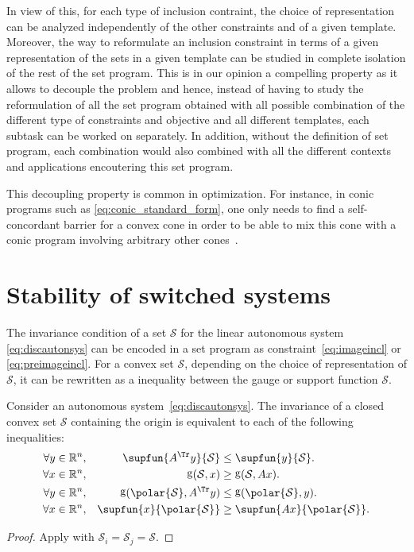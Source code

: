 \documentclass[11pt,twoside,a4paper,openright]{uclouvain-thesis}
\DeclareMathOperator{\gauge}{g}
\begin{document}
In view of this, for each type of inclusion contraint, the choice of representation
can be analyzed independently of the other constraints and of a given template.
Moreover, the way to reformulate an inclusion constraint in terms of a given representation of the sets in a given template can be studied in complete isolation of the rest of the set program.
This is in our opinion a compelling property as it allows to decouple the problem and hence,
instead of having to study the reformulation of all the set program obtained with all possible combination of the different type of constraints and objective and all different templates,
each subtask can be worked on separately.
In addition, without the definition of set program, each combination would also combined with all the different contexts and applications encoutering this set program.

This decoupling property is common in optimization.
For instance, in conic programs such as \eqref{eq:conic_standard_form},
one only needs to find a self-concordant barrier for a convex cone in order to be able to
mix this cone with a conic program involving arbitrary other cones~\cite[Section~4]{nesterov2004introductory}.




\chapter{Stability of switched systems}
\label{chap:stab}

The invariance condition of a set $\mathcal{S}$ for the linear autonomous system \eqref{eq:discautonsys} can be encoded in a set program as constraint~\eqref{eq:imageincl}
or \eqref{eq:preimageincl}.
For a convex set $\mathcal{S}$, depending on the choice of representation of $\mathcal{S}$,
it can be rewritten as a inequality between the gauge or support function $\mathcal{S}$.

\begin{mytheo}
  Consider an autonomous system~\eqref{eq:discautonsys}.
  The invariance of a closed convex set $\mathcal{S}$ containing the origin
  is equivalent to each of the following inequalities:
  \begin{align}
    \label{eq:suppASSi}
    \forall y &\in \mathbb{R}^n, & \supfun{A^\Tr y}{\mathcal{S}} & \le \supfun{y}{\mathcal{S}}.\\
    \label{eq:gaugeSASi}
    \forall x &\in \mathbb{R}^n, & \gauge(\mathcal{S}, x) & \ge \gauge(\mathcal{S}, A x).\\
    \label{eq:gaugeASSi}
    \forall y &\in \mathbb{R}^n, & \gauge(\polar{\mathcal{S}}, A^\Tr y) & \le \gauge(\polar{\mathcal{S}}, y).\\
    \label{eq:suppSASi}
    \forall x &\in \mathbb{R}^n, & \supfun{x}{\polar{\mathcal{S}}} & \ge \supfun{A x}{\polar{\mathcal{S}}}.
  \end{align}
  \begin{proof}
    Apply  with $\mathcal{S}_i = \mathcal{S}_j = \mathcal{S}$.
  \end{proof}
\end{mytheo}
\end{document}
